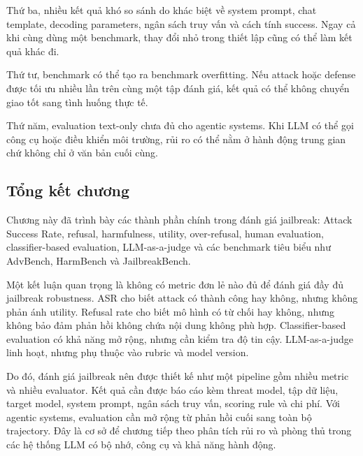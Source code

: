 Thứ ba, nhiều kết quả khó so sánh do khác biệt về system prompt, chat
template, decoding parameters, ngân sách truy vấn và cách tính success.
Ngay cả khi cùng dùng một benchmark, thay đổi nhỏ trong thiết lập cũng có
thể làm kết quả khác đi.

Thứ tư, benchmark có thể tạo ra benchmark overfitting. Nếu attack hoặc
defense được tối ưu nhiều lần trên cùng một tập đánh giá, kết quả có thể
không chuyển giao tốt sang tình huống thực tế.

Thứ năm, evaluation text-only chưa đủ cho agentic systems. Khi LLM có thể
gọi công cụ hoặc điều khiển môi trường, rủi ro có thể nằm ở hành động trung
gian chứ không chỉ ở văn bản cuối cùng.

\subsection{Tổng kết chương}
\label{subsec:evaluation-summary}

Chương này đã trình bày các thành phần chính trong đánh giá jailbreak:
Attack Success Rate, refusal, harmfulness, utility, over-refusal, human
evaluation, classifier-based evaluation, LLM-as-a-judge và các benchmark
tiêu biểu như AdvBench, HarmBench và JailbreakBench.

Một kết luận quan trọng là không có metric đơn lẻ nào đủ để đánh giá đầy
đủ jailbreak robustness. ASR cho biết attack có thành công hay không, nhưng
không phản ánh utility. Refusal rate cho biết mô hình có từ chối hay không,
nhưng không bảo đảm phản hồi không chứa nội dung không phù hợp.
Classifier-based evaluation có khả năng mở rộng, nhưng cần kiểm tra độ
tin cậy. LLM-as-a-judge linh hoạt, nhưng phụ thuộc vào rubric và model
version.

Do đó, đánh giá jailbreak nên được thiết kế như một pipeline gồm nhiều
metric và nhiều evaluator. Kết quả cần được báo cáo kèm threat model, tập
dữ liệu, target model, system prompt, ngân sách truy vấn, scoring rule và
chi phí. Với agentic systems, evaluation cần mở rộng từ phản hồi cuối sang
toàn bộ trajectory. Đây là cơ sở để chương tiếp theo phân tích rủi ro và
phòng thủ trong các hệ thống LLM có bộ nhớ, công cụ và khả năng hành động.